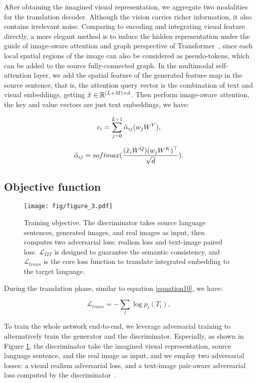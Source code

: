 \documentclass[11pt]{article}
\begin{document}
After obtaining the imagined visual representation, we aggregate two modalities for the translation decoder. Although the vision carries richer information, it also contains irrelevant noise. Comparing to encoding and integrating visual feature directly, a more elegant method is to induce the hidden representation under the guide of image-aware attention and graph perspective of Transformer~\cite{yao2020multimodal}, since each local spatial regions of the image can also be considered as pseudo-tokens, which can be added to the source fully-connected graph. In the multimodal self-attention layer, we add the spatial feature of the generated feature map in the source sentence, that is, the attention query vector is the combination of text and visual embeddings, getting $\Tilde{x}\in\mathbb{R}^{(L+M)\times d}$. Then perform image-aware attention, the key and value vectors are just text embeddings, we have:

\begin{equation}
    c_{i}=\sum_{j=0}^{L-1}\Tilde{\alpha}_{ij}(w_{j}W^{V}),
\end{equation}

\begin{equation}
    \Tilde{\alpha}_{ij}=softmax(\frac{(\Tilde{x}_{i}W^{Q})(w_{j}W^{K})^\top }{\sqrt{d}}).
\end{equation}

\subsection{Objective function}

\begin{figure}[t]
\centering
\texttt{[image: fig/figure\_3.pdf]} \caption{Training objective. The discriminator takes source language sentences, generated images, and real images as input, then computes two adversarial loss: realism loss and text-image paired loss. $\mathcal{L}_{I2T}$ is designed to guarantee the semantic consistency, and $\mathcal{L}_{trans}$ is the core loss function to translate integrated embedding to the target language.}
\label{fig3}
\end{figure}

During the translation phase, similar to equation \ref{equation10}, we have:

\begin{equation}
    \mathcal{L}_{trans} = -\sum_{t} \log p_{t}(T_{t}),
\end{equation}

To train the whole network end-to-end, we leverage adversarial training to alternatively train the generator and the discriminator. Especially, as shown in Figure \ref{fig3}, the discriminator take the imagined visual representation, source language sentence, and the real image as input, and we employ two adversarial losses: a visual realism adversarial loss, and a text-image pair-aware adversarial loss computed by the discriminator~\cite{zhang2017stackgan,xu2018attngan,qiao2019mirrorgan}. 
\end{document}
